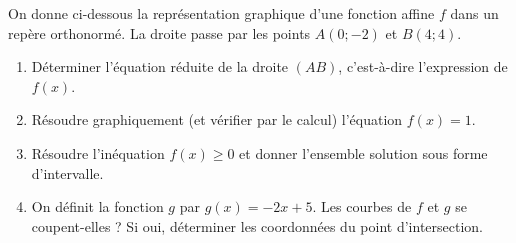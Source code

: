 \documentclass[11pt]{article}
\begin{document}
\begin{exercice}
On donne ci-dessous la représentation graphique d'une fonction affine $f$ dans un repère orthonormé. La droite passe par les points $A(0 ; -2)$ et $B(4 ; 4)$.
\begin{center}
\end{center}
\begin{enumerate}
    \item Déterminer l'équation réduite de la droite $(AB)$, c'est-à-dire l'expression de $f(x)$.
    \item Résoudre graphiquement (et vérifier par le calcul) l'équation $f(x) = 1$.
    \item Résoudre l'inéquation $f(x) \geq 0$ et donner l'ensemble solution sous forme d'intervalle.
    \item On définit la fonction $g$ par $g(x) = -2x + 5$. Les courbes de $f$ et $g$ se coupent-elles ? Si oui, déterminer les coordonnées du point d'intersection.
\end{enumerate}
\end{exercice}
\end{document}
